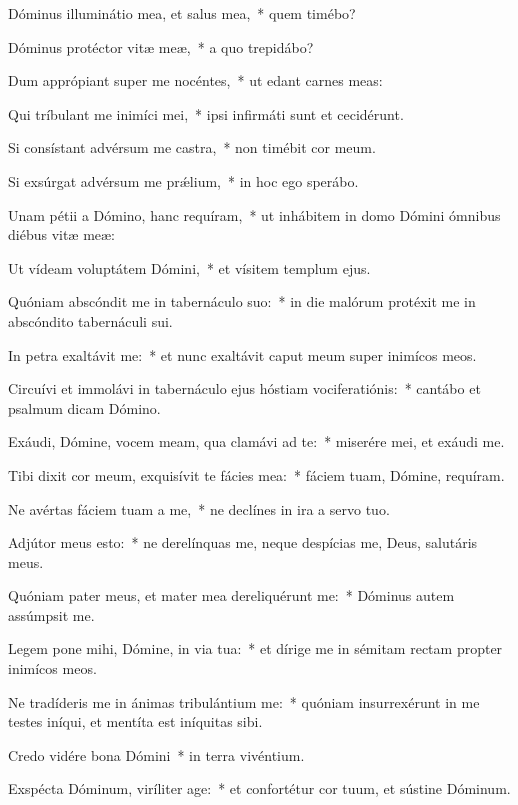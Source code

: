 \item Dóminus illuminátio mea, et salus mea,~* quem timébo?

\item Dóminus protéctor vitæ meæ,~* a quo trepidábo?

\item Dum apprópiant super me nocéntes,~* ut edant carnes meas:

\item Qui tríbulant me inimíci mei,~* ipsi infirmáti sunt et cecidérunt.

\item Si consístant advérsum me castra,~* non timébit cor meum.

\item Si exsúrgat advérsum me prǽlium,~* in hoc ego sperábo.

\item Unam pétii a Dómino, hanc requíram,~* ut inhábitem in domo Dómini ómnibus diébus vitæ meæ:

\item Ut vídeam voluptátem Dómini,~* et vísitem templum ejus.

\item Quóniam abscóndit me in tabernáculo suo:~* in die malórum protéxit me in abscóndito tabernáculi sui.

\item In petra exaltávit me:~* et nunc exaltávit caput meum super inimícos meos.

\item Circuívi et immolávi in tabernáculo ejus hóstiam vociferatiónis:~* cantábo et psalmum dicam Dómino.

\item Exáudi, Dómine, vocem meam, qua clamávi ad te:~* miserére mei, et exáudi me.

\item Tibi dixit cor meum, exquisívit te fácies mea:~* fáciem tuam, Dómine, requíram.

\item Ne avértas fáciem tuam a me,~* ne declínes in ira a servo tuo.

\item Adjútor meus esto:~* ne derelínquas me, neque despícias me, Deus, salutáris meus.

\item Quóniam pater meus, et mater mea dereliquérunt me:~* Dóminus autem assúmpsit me.

\item Legem pone mihi, Dómine, in via tua:~* et dírige me in sémitam rectam propter inimícos meos.

\item Ne tradíderis me in ánimas tribulántium me:~* quóniam insurrexérunt in me testes iníqui, et mentíta est iníquitas sibi.

\item Credo vidére bona Dómini~* in terra vivéntium.

\item Exspécta Dóminum, viríliter age:~* et confortétur cor tuum, et sústine Dóminum.

